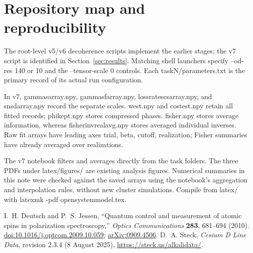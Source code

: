 \documentclass[11pt]{article}
\newcommand{\code}[1]{{\small\ttfamily\def\_{\textunderscore\allowbreak}#1}}
\begin{document}
\clearpage
\appendix
\section{Repository map and reproducibility}

The root-level v5/v6 decoherence scripts implement the earlier stages;
the v7 script is identified in Section~\ref{sec:results}. Matching
shell launchers specify \code{--od-res 140} or \code{10} and the
\code{--tensor-scale 0} controls. Each \code{task\_N/parameters.txt} is the
primary record of its actual run configuration.

In v7, \code{gamma\_s\_array.npy}, \code{gamma\_sf\_array.npy},
\code{loss\_rate\_scs\_array.npy}, and \code{sn\_sd\_array.npy} record the
separate scales. \code{w\_est.npy} and \code{cost\_est.npy} retain all fitted
records; \code{phi\_kept.npy} stores compressed phases.
\code{fisher.npy} stores average information, whereas
\code{fisher\_inv\_realavg.npy} stores averaged individual inverses.
Raw fit arrays have leading axes trial, beta, cutoff, realization; Fisher
summaries have already averaged over realizations.

The v7 notebook filters and averages directly from the task folders. The three
PDFs under \code{latex/figures/} are existing analysis figures. Numerical
summaries in this note were checked against the saved arrays using the
notebook's aggregation and interpolation rules, without new cluster simulations.
Compile from \code{latex/} with \code{latexmk -pdf open\_system\_model.tex}.

\begin{thebibliography}{9}
I.~H. Deutsch and P.~S. Jessen,
``Quantum control and measurement of atomic spins in polarization spectroscopy,''
\emph{Optics Communications} \textbf{283}, 681--694 (2010).
\href{https://doi.org/10.1016/j.optcom.2009.10.059}{doi:10.1016/j.optcom.2009.10.059};
\href{https://arxiv.org/abs/0909.4506}{arXiv:0909.4506}.
D.~A. Steck, \emph{Cesium D Line Data}, revision 2.3.4 (8 August 2025),
\url{https://steck.us/alkalidata/}.
\end{thebibliography}
\end{document}
